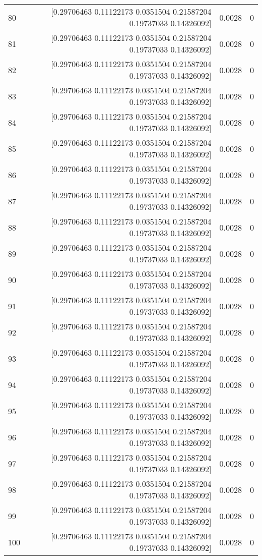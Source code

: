 \begin{longtable}{lrrr}
80 & [0.29706463 0.11122173 0.0351504  0.21587204 0.19737033 0.14326092] & 0.0028 & 0 \\
81 & [0.29706463 0.11122173 0.0351504  0.21587204 0.19737033 0.14326092] & 0.0028 & 0 \\
82 & [0.29706463 0.11122173 0.0351504  0.21587204 0.19737033 0.14326092] & 0.0028 & 0 \\
83 & [0.29706463 0.11122173 0.0351504  0.21587204 0.19737033 0.14326092] & 0.0028 & 0 \\
84 & [0.29706463 0.11122173 0.0351504  0.21587204 0.19737033 0.14326092] & 0.0028 & 0 \\
85 & [0.29706463 0.11122173 0.0351504  0.21587204 0.19737033 0.14326092] & 0.0028 & 0 \\
86 & [0.29706463 0.11122173 0.0351504  0.21587204 0.19737033 0.14326092] & 0.0028 & 0 \\
87 & [0.29706463 0.11122173 0.0351504  0.21587204 0.19737033 0.14326092] & 0.0028 & 0 \\
88 & [0.29706463 0.11122173 0.0351504  0.21587204 0.19737033 0.14326092] & 0.0028 & 0 \\
89 & [0.29706463 0.11122173 0.0351504  0.21587204 0.19737033 0.14326092] & 0.0028 & 0 \\
90 & [0.29706463 0.11122173 0.0351504  0.21587204 0.19737033 0.14326092] & 0.0028 & 0 \\
91 & [0.29706463 0.11122173 0.0351504  0.21587204 0.19737033 0.14326092] & 0.0028 & 0 \\
92 & [0.29706463 0.11122173 0.0351504  0.21587204 0.19737033 0.14326092] & 0.0028 & 0 \\
93 & [0.29706463 0.11122173 0.0351504  0.21587204 0.19737033 0.14326092] & 0.0028 & 0 \\
94 & [0.29706463 0.11122173 0.0351504  0.21587204 0.19737033 0.14326092] & 0.0028 & 0 \\
95 & [0.29706463 0.11122173 0.0351504  0.21587204 0.19737033 0.14326092] & 0.0028 & 0 \\
96 & [0.29706463 0.11122173 0.0351504  0.21587204 0.19737033 0.14326092] & 0.0028 & 0 \\
97 & [0.29706463 0.11122173 0.0351504  0.21587204 0.19737033 0.14326092] & 0.0028 & 0 \\
98 & [0.29706463 0.11122173 0.0351504  0.21587204 0.19737033 0.14326092] & 0.0028 & 0 \\
99 & [0.29706463 0.11122173 0.0351504  0.21587204 0.19737033 0.14326092] & 0.0028 & 0 \\
100 & [0.29706463 0.11122173 0.0351504  0.21587204 0.19737033 0.14326092] & 0.0028 & 0 \\

\end{longtable}
